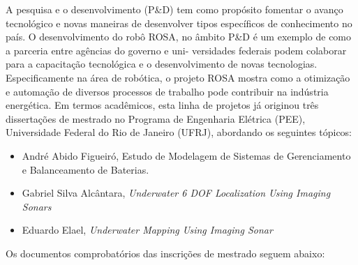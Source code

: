 A pesquisa e o desenvolvimento (P\&D) tem como propósito fomentar o avanço
tecnológico e novas maneiras de desenvolver tipos específicos de conhecimento
no país. O desenvolvimento do robô ROSA, no âmbito P\&D é um exemplo de como a
parceria entre agências do governo e uni- versidades federais podem colaborar
para a capacitação tecnológica e o desenvolvimento de novas tecnologias.
Especificamente na área de robótica, o projeto ROSA mostra como a otimização e
automação de diversos processos de trabalho pode contribuir na indústria
energética. Em termos acadêmicos, esta linha de projetos já originou três
dissertações de mestrado no Programa de Engenharia Elétrica (PEE), Universidade
Federal do Rio de Janeiro (UFRJ), abordando os seguintes tópicos:

\begin{itemize}
\item André Abido Figueiró, Estudo de Modelagem de Sistemas de Gerenciamento e
Balanceamento de Baterias.
\item Gabriel Silva Alcântara, \textit{Underwater 6 DOF Localization Using
Imaging Sonars}
\item Eduardo Elael, \textit{Underwater Mapping Using Imaging Sonar}
\end{itemize}

Os documentos comprobatórios das inscrições de mestrado seguem abaixo:



